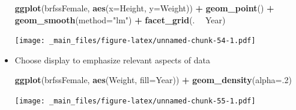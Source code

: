 \documentclass[]{article}
\newenvironment{Shaded}{\begin{snugshade}}{\end{snugshade}}
\newcommand{\KeywordTok}[1]{\textcolor[rgb]{0.13,0.29,0.53}{\textbf{#1}}}
\newcommand{\DataTypeTok}[1]{\textcolor[rgb]{0.13,0.29,0.53}{#1}}
\newcommand{\DecValTok}[1]{\textcolor[rgb]{0.00,0.00,0.81}{#1}}
\newcommand{\StringTok}[1]{\textcolor[rgb]{0.31,0.60,0.02}{#1}}
\newcommand{\OperatorTok}[1]{\textcolor[rgb]{0.81,0.36,0.00}{\textbf{#1}}}
\newcommand{\NormalTok}[1]{#1}
\theoremstyle{definition}
\theoremstyle{definition}
\theoremstyle{remark}
\begin{document}
\begin{itemize}
\begin{Shaded}
\begin{Highlighting}[]
\KeywordTok{ggplot}\NormalTok{(brfssFemale, }\KeywordTok{aes}\NormalTok{(}\DataTypeTok{x=}\NormalTok{Height, }\DataTypeTok{y=}\NormalTok{Weight)) }\OperatorTok{+}
\StringTok{    }\KeywordTok{geom_point}\NormalTok{() }\OperatorTok{+}\StringTok{ }\KeywordTok{geom_smooth}\NormalTok{(}\DataTypeTok{method=}\StringTok{"lm"}\NormalTok{) }\OperatorTok{+}
\StringTok{    }\KeywordTok{facet_grid}\NormalTok{(. }\OperatorTok{~}\StringTok{ }\NormalTok{Year)}
\end{Highlighting}
\end{Shaded}

  \texttt{[image: \_main\_files/figure-latex/unnamed-chunk-54-1.pdf]}
\item
  Choose display to emphasize relevant aspects of data

\begin{Shaded}
\begin{Highlighting}[]
\KeywordTok{ggplot}\NormalTok{(brfssFemale, }\KeywordTok{aes}\NormalTok{(Weight, }\DataTypeTok{fill=}\NormalTok{Year)) }\OperatorTok{+}
\StringTok{    }\KeywordTok{geom_density}\NormalTok{(}\DataTypeTok{alpha=}\NormalTok{.}\DecValTok{2}\NormalTok{)}
\end{Highlighting}
\end{Shaded}

  \texttt{[image: \_main\_files/figure-latex/unnamed-chunk-55-1.pdf]}
\end{itemize}
\end{document}
